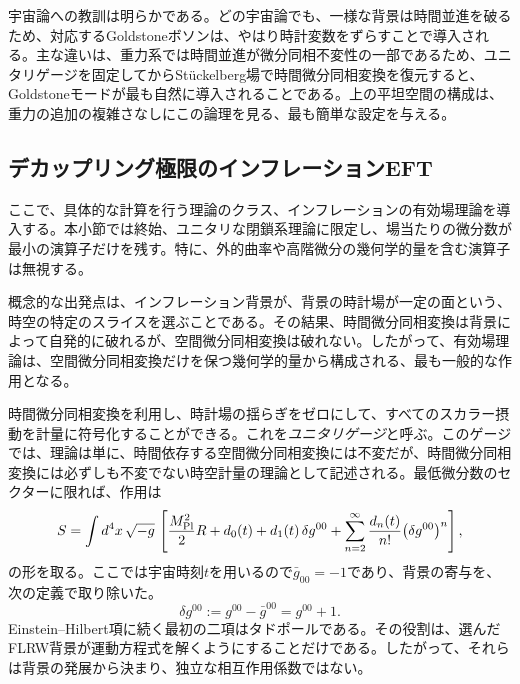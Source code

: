 \documentclass[a4paper,11pt,oneside]{article}
\theoremstyle{definition}
\numberwithin{equation}{section}
\begin{document}
宇宙論への教訓は明らかである。どの宇宙論でも、一様な背景は時間並進を破るため、対応するGoldstoneボソンは、やはり時計変数をずらすことで導入される。主な違いは、重力系では時間並進が微分同相不変性の一部であるため、ユニタリゲージを固定してからSt\"uckelberg場で時間微分同相変換を復元すると、Goldstoneモードが最も自然に導入されることである。上の平坦空間の構成は、重力の追加の複雑さなしにこの論理を見る、最も簡単な設定を与える。





\subsection{デカップリング極限のインフレーションEFT}



ここで、具体的な計算を行う理論のクラス、インフレーションの有効場理論を導入する。本小節では終始、ユニタリな閉鎖系理論に限定し、場当たりの微分数が最小の演算子だけを残す。特に、外的曲率や高階微分の幾何学的量を含む演算子は無視する。



概念的な出発点は、インフレーション背景が、背景の時計場が一定の面という、時空の特定のスライスを選ぶことである。その結果、時間微分同相変換は背景によって自発的に破れるが、空間微分同相変換は破れない。したがって、有効場理論は、空間微分同相変換だけを保つ幾何学的量から構成される、最も一般的な作用となる。



時間微分同相変換を利用し、時計場の揺らぎをゼロにして、すべてのスカラー摂動を計量に符号化することができる。これを\textit{ユニタリゲージ}と呼ぶ。このゲージでは、理論は単に、時間依存する空間微分同相変換には不変だが、時間微分同相変換には必ずしも不変でない時空計量の理論として記述される。最低微分数のセクターに限れば、作用は
\begin{equation}\label{EFTI-unitary}
S
=
\int d^4x\,\sqrt{-g}\,
\left[
\frac{M_{\rm Pl}^2}{2}R
+d_0(t)
+d_1(t)\,\delta g^{00}
+\sum_{n=2}^{\infty}\frac{d_n(t)}{n!}\bigl(\delta g^{00}\bigr)^n
\right] ,
\end{equation}
の形を取る。ここでは宇宙時刻$  t $を用いるので$  \bar g_{00}=-1 $であり、背景の寄与を、次の定義で取り除いた。
\begin{equation}
\delta g^{00}:=g^{00}-\bar g^{00}=g^{00}+1 .
\end{equation}
Einstein--Hilbert項に続く最初の二項はタドポールである。その役割は、選んだFLRW背景が運動方程式を解くようにすることだけである。したがって、それらは背景の発展から決まり、独立な相互作用係数ではない。
\end{document}
